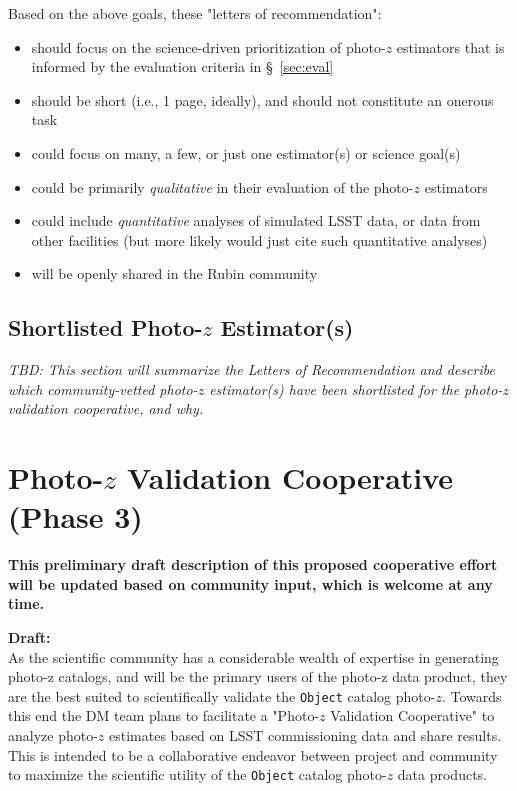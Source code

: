\documentclass[DM,lsstdraft,toc]{lsstdoc}
\begin{document}
Based on the above goals, these "letters of recommendation":
\begin{itemize}
\item should focus on the science-driven prioritization of photo-$z$ estimators that is informed by the evaluation criteria in  \S~\ref{sec:eval}
\item should be short (i.e., 1 page, ideally), and should not constitute an onerous task
\item could focus on many, a few, or just one estimator(s) or science goal(s)
\item could be primarily {\it qualitative} in their evaluation of the photo-$z$ estimators
\item could include {\it quantitative} analyses of simulated LSST data, or data from other facilities (but more likely would just cite such quantitative analyses)
\item will be openly shared in the Rubin community
\end{itemize}


\subsection{Shortlisted Photo-$z$ Estimator(s)} \label{ssec:lor_choice}

\textit{TBD: This section will summarize the Letters of Recommendation and describe which community-vetted photo-$z$ estimator(s) have been shortlisted for the photo-$z$ validation cooperative, and why.}


\clearpage
\section{Photo-$z$ Validation Cooperative (Phase 3)}\label{sec:pzcoop}

\textbf{This preliminary draft description of this proposed cooperative effort will be updated based on community input, which is welcome at any time.}

\textbf{Draft:} \\
As the scientific community has a considerable wealth of expertise in generating photo-z catalogs, and will be the primary users of the photo-z data product, they are the best suited to scientifically validate the {\tt Object} catalog photo-$z$.
Towards this end the DM team plans to facilitate a "Photo-$z$ Validation Cooperative" to analyze photo-$z$ estimates based on LSST commissioning data and share results.
This is intended to be a collaborative endeavor between project and community to maximize the scientific utility of the {\tt Object} catalog photo-$z$ data products.
\end{document}
